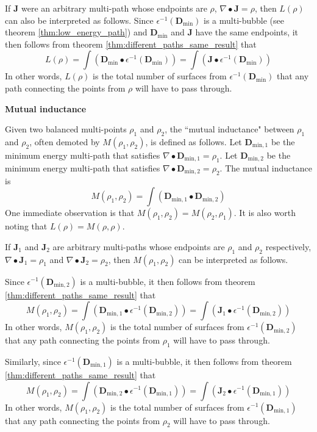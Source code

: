 If \(\mathbf{J}\) were an arbitrary multi-path whose endpoints are \(\rho\), \(\nabla \bullet \mathbf{J} = \rho\), then \(L(\rho)\) can also be interpreted as follows. Since \(\epsilon^{-1}(\mathbf{D}_{\text{min}})\) is a multi-bubble (see theorem \ref{thm:low_energy_path}) and \(\mathbf{D}_{\text{min}}\) and \(\mathbf{J}\) have the same endpoints, it then follows from theorem \ref{thm:different_paths_same_result} that 
\[L(\rho) = \int (\mathbf{D}_{\text{min}} \bullet \epsilon^{-1}(\mathbf{D}_{\text{min}})) = \int (\mathbf{J} \bullet \epsilon^{-1}(\mathbf{D}_{\text{min}}))\]
In other words, \(L(\rho)\) is the total number of surfaces from \(\epsilon^{-1}(\mathbf{D}_{\text{min}})\) that any path connecting the points from \(\rho\) will have to pass through.

\vspace{5mm}

\textbf{Mutual inductance}

Given two balanced multi-points \(\rho_1\) and \(\rho_2\), the ``mutual inductance" between \(\rho_1\) and \(\rho_2\), often demoted by \(M(\rho_1, \rho_2)\), is defined as follows. 
Let \(\mathbf{D}_{\text{min},1}\) be the minimum energy multi-path that satisfies \(\nabla \bullet \mathbf{D}_{\text{min},1} = \rho_1\).
Let \(\mathbf{D}_{\text{min},2}\) be the minimum energy multi-path that satisfies \(\nabla \bullet \mathbf{D}_{\text{min},2} = \rho_2\). 
The mutual inductance is 
\[M(\rho_1, \rho_2) = \int (\mathbf{D}_{\text{min},1} \bullet \mathbf{D}_{\text{min},2})\]
One immediate observation is that \(M(\rho_1, \rho_2) = M(\rho_2, \rho_1)\). It is also worth noting that \(L(\rho) = M(\rho,\rho)\).

If \(\mathbf{J}_1\) and \(\mathbf{J}_2\) are arbitrary multi-paths whose endpoints are \(\rho_1\) and \(\rho_2\) respectively, \(\nabla \bullet \mathbf{J}_1 = \rho_1\) and \(\nabla \bullet \mathbf{J}_2 = \rho_2\), then \(M(\rho_1, \rho_2)\) can be interpreted as follows. 

Since \(\epsilon^{-1}(\mathbf{D}_{\text{min},2})\) is a multi-bubble, it then follows from theorem \ref{thm:different_paths_same_result} that 
\[M(\rho_1, \rho_2) = \int (\mathbf{D}_{\text{min},1} \bullet \epsilon^{-1}(\mathbf{D}_{\text{min},2})) = \int (\mathbf{J}_1 \bullet \epsilon^{-1}(\mathbf{D}_{\text{min},2}))\]
In other words, \(M(\rho_1, \rho_2)\) is the total number of surfaces from \(\epsilon^{-1}(\mathbf{D}_{\text{min},2})\) that any path connecting the points from \(\rho_1\) will have to pass through.

Similarly, since \(\epsilon^{-1}(\mathbf{D}_{\text{min},1})\) is a multi-bubble, it then follows from theorem \ref{thm:different_paths_same_result} that 
\[M(\rho_1, \rho_2) = \int (\mathbf{D}_{\text{min},2} \bullet \epsilon^{-1}(\mathbf{D}_{\text{min},1})) = \int (\mathbf{J}_2 \bullet \epsilon^{-1}(\mathbf{D}_{\text{min},1}))\]
In other words, \(M(\rho_1, \rho_2)\) is the total number of surfaces from \(\epsilon^{-1}(\mathbf{D}_{\text{min},1})\) that any path connecting the points from \(\rho_2\) will have to pass through.

